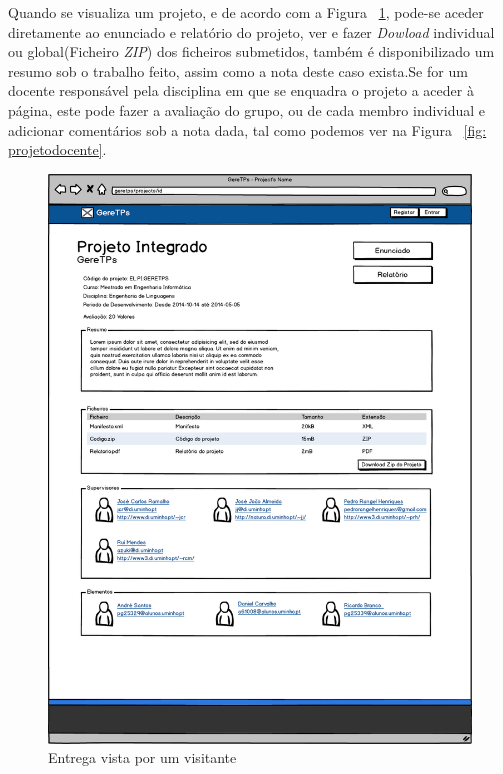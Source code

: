 Quando se visualiza um projeto, e de acordo com a Figura ~\ref{fig: projetoaluno}, pode-se aceder diretamente ao enunciado e relatório do projeto, ver e fazer \emph{Dowload} individual ou global(Ficheiro \emph{ZIP}) dos ficheiros submetidos, também é disponibilizado um resumo sob o trabalho feito, assim como a nota deste caso exista.Se for um docente responsável pela disciplina em que se enquadra o projeto a aceder à página, este pode fazer a avaliação do grupo, ou de cada membro individual e adicionar comentários sob a nota dada, tal como podemos ver na Figura ~\ref{fig: projetodocente}.\\

\begin{figure}[htbp]
        \centering
        \includegraphics[width=1\textwidth]{images/prototipos/mockups/projetovisitante.png}
         \caption{Entrega vista por um visitante}
         \label{fig: projetoaluno}
\end{figure}

